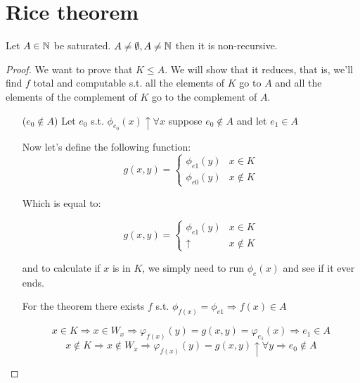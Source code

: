 \section {Rice theorem}

\begin{theorem}
  Let $ A \in \mathbb{N} $ be saturated. $ A \neq \emptyset, A \neq \mathbb{N} $
  then it is non-recursive.
\end{theorem}

\begin{proof}
  We want to prove that $ K \leq A $. We will show that it reduces,
  that is, we'll find $f$ total and computable s.t. all the elements
  of $K$ go to $A$ and all the elements of the complement of $K$ go to
  the complement of $A$.

  \begin{itemize}
  \item[($e_0 \notin A$)]
    Let $ e_0$ s.t. $ \phi_{e_0}(x)\uparrow\forall x $ suppose
    $ e_0\notin A $ and let $ e_1\in A $

    Now let's define the following function:
    \begin{equation*}
      g(x,y) = \begin{cases}
        \phi_{e1}(y) & x \in K \\
        \phi_{e0}(y) & x \notin K
      \end{cases}
    \end{equation*}

    Which is equal to:

    \begin{equation*}
      g(x,y) =
      \begin{cases}
        \phi_{e1}(y) & x \in K \\
        \uparrow & x \notin K
      \end{cases}
    \end{equation*}

    and to calculate if $x$ is in $K$, we simply need to run $ \phi_e(x) $
    and see if it ever ends.

    For the \smn theorem there exists $f$ s.t.
    $ \phi_{f(x)} = \phi_{e1} \Rightarrow f(x)\in A$

    \begin{equation}\label{eq:one14}
      x \in K
      \Rightarrow x \in W_x
      \Rightarrow \varphi_{f(x)}(y) = g(x,y) = \varphi_{e_1}(x)
      \Rightarrow e_1 \in A
    \end{equation}
    \begin{equation}\label{eq:two14}
      x \notin K
      \Rightarrow x \notin W_x
      \Rightarrow \varphi_{f(x)}(y) = g(x,y)\uparrow \forall y
      \Rightarrow e_0 \notin A
    \end{equation}


\end{itemize}
\end{proof}
